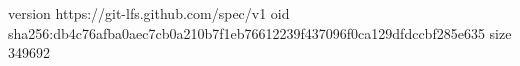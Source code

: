 version https://git-lfs.github.com/spec/v1
oid sha256:db4c76afba0aec7cb0a210b7f1eb76612239f437096f0ca129dfdccbf285e635
size 349692
